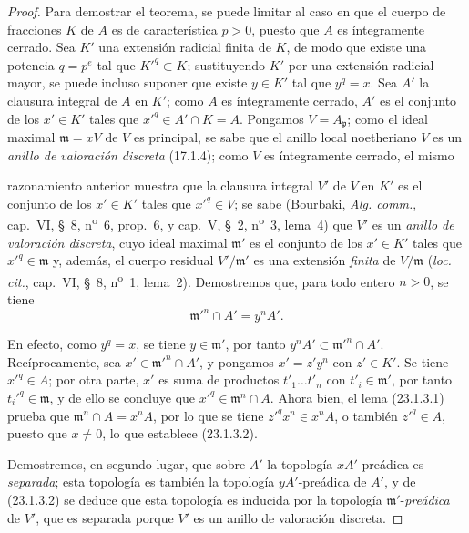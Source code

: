 \begin{proof}
Para demostrar el teorema, se puede limitar al caso en que el cuerpo de fracciones
$K$ de $A$ es de característica $p>0$, puesto que $A$ es íntegramente cerrado.
Sea $K'$ una extensión radicial finita de $K$, de modo que existe una
potencia $q=p^e$ tal que $K'^q\subset K$; sustituyendo $K'$ por una
extensión radicial mayor, se puede incluso suponer que existe $y\in K'$ tal
que $y^q=x$. Sea $A'$ la clausura integral de $A$ en $K'$; como
$A$ es íntegramente cerrado, $A'$ es el conjunto de los $x'\in K'$ tales que
$x'^q\in A'\cap K=A$. Pongamos $V=A_{\mathfrak p}$; como el ideal maximal
$\mathfrak m=xV$ de $V$ es principal, se sabe que el anillo local
noetheriano $V$ es un \emph{anillo de valoración discreta} (17.1.4); como
$V$ es íntegramente cerrado, el mismo


razonamiento anterior muestra que la clausura integral $V'$ de $V$ en
$K'$ es el conjunto de los $x'\in K'$ tales que $x'^q\in V$; se sabe
(Bourbaki, \emph{Alg. comm.}, cap.~VI, §~8, n\textsuperscript{o}~6,
prop.~6, y cap.~V, §~2, n\textsuperscript{o}~3, lema~4) que $V'$ es un
\emph{anillo de valoración discreta}, cuyo ideal maximal $\mathfrak m'$ es
el conjunto de los $x'\in K'$ tales que $x'^q\in\mathfrak m$ y, además, el cuerpo
residual $V'/\mathfrak m'$ es una extensión \emph{finita} de
$V/\mathfrak m$ (\emph{loc. cit.}, cap.~VI, §~8,
n\textsuperscript{o}~1, lema~2). Demostremos que, para todo entero $n>0$, se tiene
\begin{equation}
\label{0.23.1.3.2-fr}
  \mathfrak m'^n\cap A'=y^nA'.
  \tag{23.1.3.2}
\end{equation}

En efecto, como $y^q=x$, se tiene $y\in\mathfrak m'$, por tanto
$y^nA'\subset\mathfrak m'^n\cap A'$. Recíprocamente, sea
$x'\in\mathfrak m'^n\cap A'$, y pongamos $x'=z'y^n$ con $z'\in K'$. Se tiene
$x'^q\in A$; por otra parte, $x'$ es suma de productos
$t'_1\ldots t'_n$ con $t'_i\in\mathfrak m'$, por tanto
$t_i'^q\in\mathfrak m$, y de ello se concluye que
$x'^q\in\mathfrak m^n\cap A$. Ahora bien, el lema (23.1.3.1) prueba que
$\mathfrak m^n\cap A=x^nA$, por lo que se tiene $z'^qx^n\in x^nA$, o también
$z'^q\in A$, puesto que $x\neq0$, lo que establece (23.1.3.2).

Demostremos, en segundo lugar, que sobre $A'$ la topología $xA'$-preádica es
\emph{separada}; esta topología es también la topología $yA'$-preádica de
$A'$, y de (23.1.3.2) se deduce que esta topología es inducida por la
topología $\mathfrak m'$-\emph{preádica} de $V'$, que es separada porque $V'$ es
un anillo de valoración discreta.


\end{proof}
